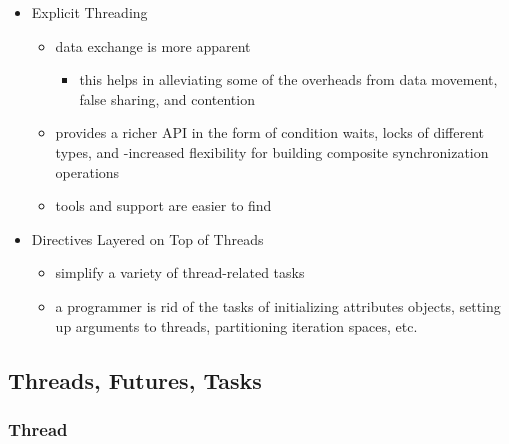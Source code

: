 \begin{itemize}
\tightlist
\item
  Explicit Threading

  \begin{itemize}
  \tightlist
  \item
    data exchange is more apparent

    \begin{itemize}
    \tightlist
    \item
      this helps in alleviating some of the overheads from data
      movement, false sharing, and contention
    \end{itemize}
  \item
    provides a richer API in the form of condition waits, locks of
    different types, and -increased flexibility for building composite
    synchronization operations
  \item
    tools and support are easier to find
  \end{itemize}
\item
  Directives Layered on Top of Threads

  \begin{itemize}
  \tightlist
  \item
    simplify a variety of thread-related tasks
  \item
    a programmer is rid of the tasks of initializing attributes objects,
    setting up arguments to threads, partitioning iteration spaces, etc.
  \end{itemize}
\end{itemize}

\hypertarget{threads-futures-tasks}{%
\subsection{Threads, Futures, Tasks}\label{threads-futures-tasks}}

\hypertarget{thread}{%
\subsubsection{Thread}\label{thread}}

